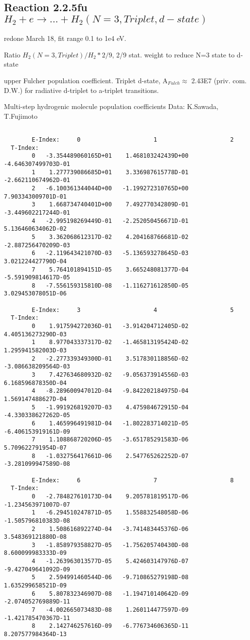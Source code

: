 \documentclass[12pt,dvipdfmx]{article}
\begin{document}
\subsection{
Reaction 2.2.5fu $H_2 + e \rightarrow ...+ H_2(N=3,Triplet, d-state)$}
redone March 18, fit range 0.1 to 1e4 eV.

Ratio $H_2(N=3, Triplet)/H_2*2/9 $,  2/9 stat. weight to reduce N=3 state to d-state

upper Fulcher population coefficient. Triplet d-state, A$_{Fulch} \approx $ 2.43E7  (priv. com. D.W.)
for radiative d-triplet to a-triplet transitions.

 Multi-step hydrogenic molecule population coefficients
 Data: K.Sawada, T.Fujimoto \cite{kn:Sawada}
\begin{small}\begin{verbatim}

        E-Index:     0                     1                     2
  T-Index:
        0   -3.354489060165D+01    1.468103242439D+00   -4.646307499703D-01
        1    1.277739086685D+01    3.336987615778D-01   -2.662110674962D-01
        2   -6.100361344044D+00   -1.199272310765D+00    7.903343009701D-01
        3    1.668734740401D+00    7.492770342809D-01   -3.449602217244D-01
        4   -2.995198269449D-01   -2.252050456671D-01    5.136460634062D-02
        5    3.362068612317D-02    4.204168766681D-02   -2.887256470209D-03
        6   -2.119643421070D-03   -5.136593278645D-03    3.021224427790D-04
        7    5.764101894151D-05    3.665248081377D-04   -5.591909814617D-05
        8   -7.556159315810D-08   -1.116271612850D-05    3.029453078051D-06

        E-Index:     3                     4                     5
  T-Index:
        0    1.917594272036D-01   -3.914204712405D-02    4.405136273290D-03
        1    8.977043337317D-02   -1.465813195424D-02    1.295941582003D-03
        2   -2.277339349300D-01    3.517830118856D-02   -3.086638209564D-03
        3    7.427634680932D-02   -9.056373914556D-03    6.168596878350D-04
        4   -8.289600947012D-04   -9.842202184975D-04    1.569147488627D-04
        5   -1.991926819207D-03    4.475984672915D-04   -4.330338627262D-05
        6    1.465996491981D-04   -1.802283714021D-05   -6.406153919161D-09
        7    1.108868720206D-05   -3.651785291583D-06    5.709622791954D-07
        8   -1.032756417661D-06    2.547765262252D-07   -3.281099947589D-08

        E-Index:     6                     7                     8
  T-Index:
        0   -2.784827610173D-04    9.205781819517D-06   -1.234563971007D-07
        1   -6.294510247871D-05    1.558832548058D-06   -1.505796810383D-08
        2    1.508616892274D-04   -3.741483445376D-06    3.548369121880D-08
        3   -1.858979358827D-05   -1.756205740430D-08    8.600099983333D-09
        4   -1.263963013577D-05    5.424603147976D-07   -9.427049641092D-09
        5    2.594991460544D-06   -9.710865279198D-08    1.635299658521D-09
        6    5.807832346907D-08   -1.194710140642D-09   -2.074052769889D-11
        7   -4.002665073483D-08    1.260114477597D-09   -1.421785470367D-11
        8    2.142746257616D-09   -6.776734606365D-11    8.207577984364D-13


\end{verbatim}
\end{small}
\end{document}
